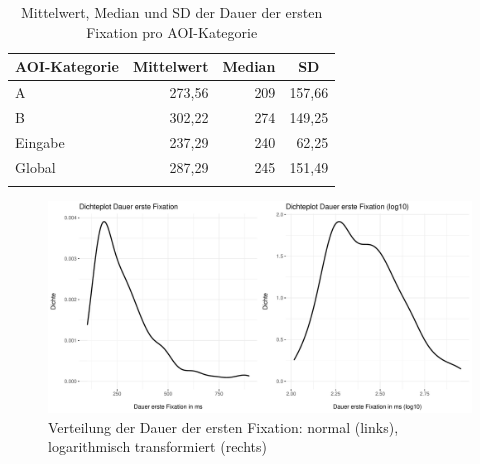 \begin{table}
    \begin{tabular}{lrrr}  
    \lsptoprule
        {AOI-Kategorie} & \multicolumn{1}{c}{Mittelwert} & \multicolumn{1}{c}{Median} & \multicolumn{1}{c}{SD} \\ 
        \midrule
        A   & 273,56 & 209 & 157,66 \\ 
        B   & 302,22 & 274 & 149,25\\ 
        Eingabe   & 237,29 & 240 &  62,25 \\ 
        \midrule
        Global  & 287,29 & 245 & 151,49\\ 
        \lspbottomrule
    \end{tabular}
            \caption[Mittelwert, Median und SD der Dauer der ersten Fixation]{Mittelwert, Median und SD der Dauer der ersten Fixation pro AOI-Kategorie}
    \label{K6:tab:DeDe:mean-sd-iaffd}
\end{table}





\begin{figure}
    \includegraphics[width=\textwidth]{Figures/EyeTracking/DD/ggplot_DD-FFDur_density_de}
	\caption{Verteilung der Dauer der ersten Fixation: normal (links), 
             logarithmisch transformiert (rechts)\label{K6:fig:DD:density-ffdur}}
\end{figure}


